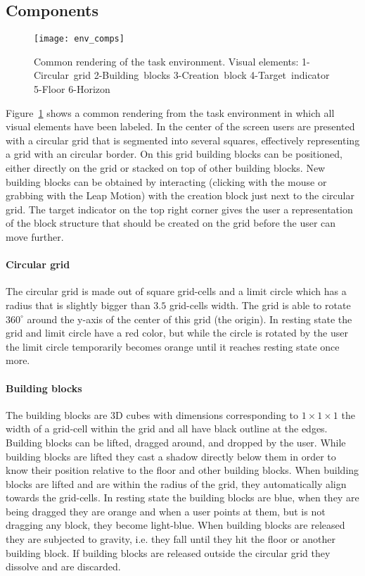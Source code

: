 \subsection{Components}

\begin{figure}[H]
\centering
\texttt{[image: env\_comps]}
\caption{\label{fig:environmentcomps} Common rendering of the task environment. Visual elements: 1-Circular~grid 2-Building~blocks 3-Creation~block 4-Target~indicator 5-Floor 6-Horizon}
\end{figure}

\noindent Figure~\ref{fig:environmentcomps} shows a common rendering from the task environment in which all visual elements have been labeled. In the center of the screen users are presented with a circular grid that is segmented into several squares, effectively representing a grid with an circular border. On this grid building blocks can be positioned, either directly on the grid or stacked on top of other building blocks. New building blocks can be obtained by interacting (clicking with the mouse or grabbing with the Leap Motion) with the creation block just next to the circular grid. The target indicator on the top right corner gives the user a representation of the block structure that should be created on the grid before the user can move further.

\paragraph{Circular grid}
The circular grid is made out of square grid-cells and a limit circle which has a radius that is slightly bigger than $3.5$ grid-cells width. The grid is able to rotate $360^{\circ}$ around the y-axis of the center of this grid (the origin). In resting state the grid and limit circle have a red color, but while the circle is rotated by the user the limit circle temporarily becomes orange until it reaches resting state once more. 

\paragraph{Building blocks}
The building blocks are 3D cubes with dimensions corresponding to $1\times 1\times 1$ the width of a grid-cell within the grid and all have black outline at the edges. Building blocks can be lifted, dragged around, and dropped by the user. While building blocks are lifted they cast a shadow directly below them in order to know their position relative to the floor and other building blocks. When building blocks are lifted and are within the radius of the grid, they automatically align towards the grid-cells. In resting state the building blocks are blue, when they are being dragged they are orange and when a user points at them, but is not dragging any block, they become light-blue. When building blocks are released they are subjected to gravity, i.e. they fall until they hit the floor or another building block. If building blocks are released outside the circular grid they dissolve and are discarded.

